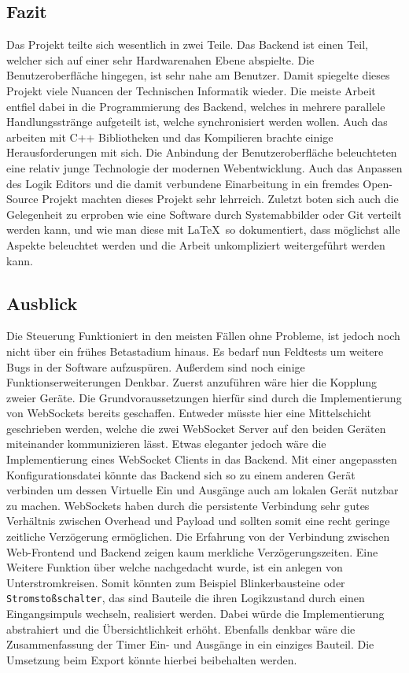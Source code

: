  \subsection{Fazit}
 Das Projekt teilte sich wesentlich in zwei Teile. Das Backend ist einen Teil, welcher sich auf einer sehr Hardwarenahen Ebene abspielte. Die Benutzeroberfläche hingegen, ist sehr nahe am Benutzer. Damit spiegelte dieses Projekt viele Nuancen der Technischen Informatik wieder. Die meiste Arbeit entfiel dabei in die Programmierung des Backend, welches in mehrere parallele Handlungsstränge aufgeteilt ist, welche synchronisiert werden wollen. Auch das arbeiten mit C++ Bibliotheken und das Kompilieren brachte einige Herausforderungen mit sich. Die Anbindung der Benutzeroberfläche beleuchteten eine relativ junge Technologie der modernen Webentwicklung. Auch das Anpassen des Logik Editors und die damit verbundene Einarbeitung in ein fremdes Open-Source Projekt machten dieses Projekt sehr lehrreich. Zuletzt boten sich auch die Gelegenheit zu erproben wie eine Software durch Systemabbilder oder Git verteilt werden kann, und wie man diese mit \LaTeX\ so dokumentiert, dass möglichst alle Aspekte beleuchtet werden und die  Arbeit unkompliziert weitergeführt werden kann.
 
 \subsection{Ausblick}
 Die Steuerung Funktioniert in den meisten Fällen ohne Probleme, ist jedoch noch nicht über ein frühes Betastadium hinaus. Es bedarf nun Feldtests um weitere Bugs in der Software aufzuspüren. Außerdem sind noch einige Funktionserweiterungen Denkbar. Zuerst anzuführen wäre hier die Kopplung zweier Geräte. Die Grundvoraussetzungen hierfür sind durch die Implementierung  von WebSockets bereits geschaffen. Entweder müsste hier eine Mittelschicht geschrieben werden, welche die zwei WebSocket Server auf den beiden Geräten miteinander kommunizieren lässt. Etwas eleganter jedoch wäre die Implementierung eines WebSocket Clients in das Backend. Mit einer angepassten Konfigurationsdatei könnte das Backend sich so zu einem anderen Gerät verbinden um dessen Virtuelle Ein und Ausgänge auch am lokalen Gerät nutzbar zu machen. WebSockets haben durch die persistente Verbindung sehr gutes Verhältnis zwischen Overhead und Payload und sollten somit eine recht geringe zeitliche Verzögerung ermöglichen. Die Erfahrung von der Verbindung zwischen Web-Frontend und Backend zeigen kaum merkliche Verzögerungszeiten. Eine Weitere Funktion über welche nachgedacht wurde, ist ein anlegen von Unterstromkreisen. Somit könnten zum Beispiel Blinkerbausteine oder \texttt{Stromstoßschalter}, das sind Bauteile die ihren Logikzustand durch einen Eingangsimpuls wechseln, realisiert werden. Dabei würde die Implementierung abstrahiert und die Übersichtlichkeit erhöht. Ebenfalls denkbar wäre die Zusammenfassung der Timer Ein- und Ausgänge in ein einziges Bauteil. Die Umsetzung beim Export könnte hierbei beibehalten werden. 
  

 
 
\clearpage